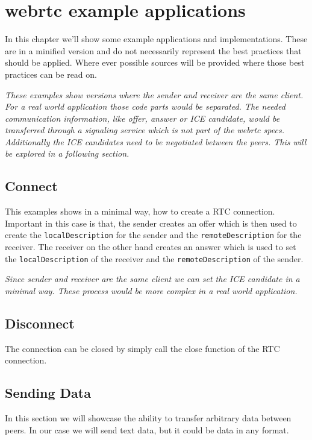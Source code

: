 \clearpage
\chapter{\Gls{webrtc} example applications}
In this chapter we'll show some example applications and implementations. These are in a minified version and do not necessarily represent the best practices that should be applied. Where ever possible sources will be provided where those best practices can be read on.

\textit{These examples show versions where the sender and receiver are the same client. For a real world application those code parts would be separated. The needed communication information, like offer, answer or ICE candidate, would be transferred through a signaling service which is not part of the \Gls{webrtc} specs. Additionally the ICE candidates need to be negotiated between the peers. This will be explored in a following section.}

\section{Connect}
This examples shows in a minimal way, how to create a RTC connection. Important in this case is that, the sender creates an offer which is then used to create the \lstinline[basicstyle=\ttfamily\color{black}]|localDescription| for the sender and the \lstinline[basicstyle=\ttfamily\color{black}]|remoteDescription| for the receiver. The receiver on the other hand creates an answer which is used to set the \lstinline[basicstyle=\ttfamily\color{black}]|localDescription| of the receiver and the \lstinline[basicstyle=\ttfamily\color{black}]|remoteDescription| of the sender.

\textit{Since sender and receiver are the same client we can set the ICE candidate in a minimal way. These process would be more complex in a real world application.}


\section{Disconnect}
The connection can be closed by simply call the close function of the RTC connection.


\section{Sending Data}
In this section we will showcase the ability to transfer arbitrary data between peers. In our case we will send text data, but it could be data in any format.

